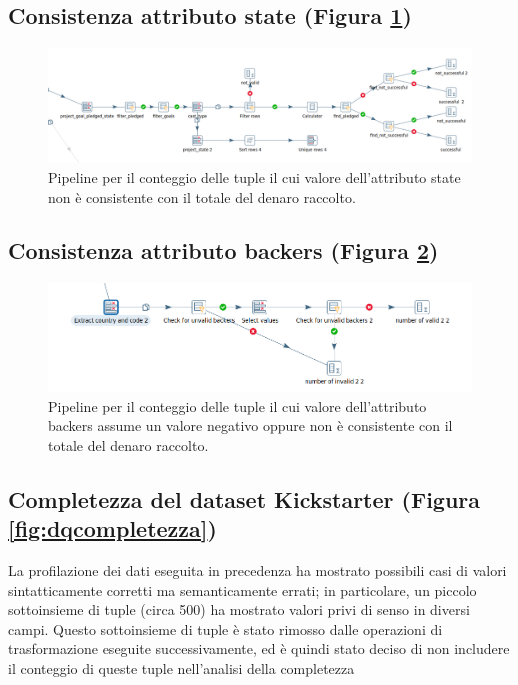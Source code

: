 \subsection{Consistenza attributo state (Figura \ref{fig:dqstateaconsistency})}

\begin{figure}[h!]
	\centering
	\includegraphics[width=0.7\linewidth]{images/DQ_stateaconsistency}
	\caption{Pipeline per il conteggio delle tuple il cui valore dell'attributo state non è consistente con il totale del denaro raccolto.}
	\label{fig:dqstateaconsistency}
\end{figure}


\subsection{Consistenza attributo backers (Figura \ref{fig:dqbackersconsistency})}

\begin{figure}[h!]
	\centering
	\includegraphics[width=0.7\linewidth]{images/DQ_backersconsistency}
	\caption{Pipeline per il conteggio delle tuple il cui valore dell'attributo backers assume un valore negativo oppure non è consistente con il totale del denaro raccolto.}
	\label{fig:dqbackersconsistency}
\end{figure}


\subsection{Completezza del dataset Kickstarter (Figura \ref{fig:dqcompletezza})}
La profilazione dei dati eseguita in precedenza ha mostrato possibili casi di valori sintatticamente corretti ma semanticamente errati; in particolare, un piccolo sottoinsieme di tuple (circa 500) ha mostrato valori privi di senso in diversi campi. Questo sottoinsieme di tuple è stato rimosso dalle operazioni di trasformazione eseguite successivamente, ed è quindi stato deciso di non includere il conteggio di queste tuple nell'analisi della completezza

